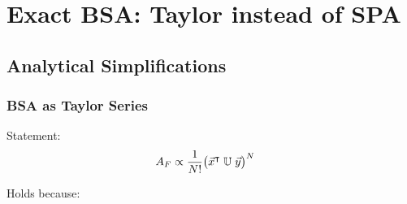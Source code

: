 \documentclass[
	english,
	a4paper,
	fontsize=10pt,
	parskip=half,
	titlepage=true,
	DIV=12,
	final
]{scrreprt}
\newcommand*{\transp}{\ensuremath{^\intercal}}
\begin{document}
\chapter{Exact BSA: Taylor instead of SPA}
\section{Analytical Simplifications}
\subsection{BSA as Taylor Series}
Statement:
\begin{align}
	A_F
&\propto
	\frac{1}{N!}
	\qty( \big. \vec{x}\transp \; \mathbb{U} \; \vec{y} )^{N}
\end{align}

Holds because:
\end{document}
